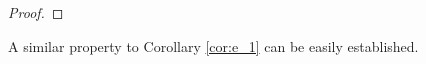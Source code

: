 \documentclass[reqno, 12pt, a4paper]{amsart}
\theoremstyle{plain}
\theoremstyle{definition}
\begin{document}
\begin{proof}
%
\end{proof}



A similar property to Corollary \ref{cor:e_1} can be easily established. 
\end{document}
